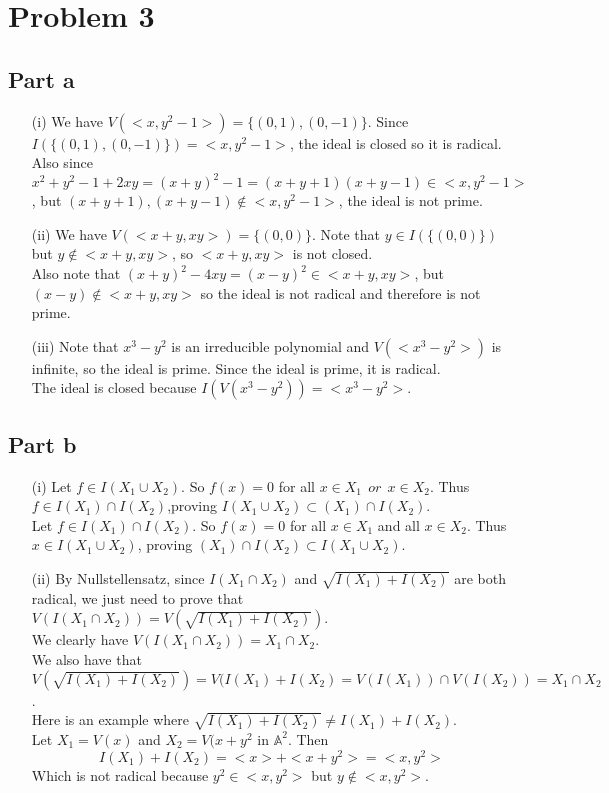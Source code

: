 \documentclass[12pt]{article}
\begin{document}
\clearpage
\section*{Problem 3}
\subsection*{Part a}
\begin{enumerate}
\item[(i)]
We have $V(<x,y^2-1>)=\{(0,1),(0,-1)\}$. Since $I(\{(0,1),(0,-1)\})=<x,y^2-1>$, the ideal is closed so it is radical. \\
Also since $x^2+y^2-1+2xy=(x+y)^2-1=(x+y+1)(x+y-1) \in <x,y^2-1>$, but $(x+y+1),(x+y-1) \not\in <x,y^2-1>$, the ideal is not prime.

\item[(ii)]
We have $V(<x+y,xy>)=\{(0,0)\}$. Note that $y \in I(\{(0,0)\})$ but $y \not\in <x+y,xy>$, so $<x+y,xy>$ is not closed. \\
Also note that $(x+y)^2-4xy=(x-y)^2 \in <x+y,xy>$, but $(x-y) \not\in <x+y,xy>$ so the ideal is not radical and therefore is not prime.
\item[(iii)]
Note that $x^3-y^2$ is an irreducible polynomial and $V(<x^3-y^2>)$ is infinite, so the ideal is prime. Since the ideal is prime, it is radical. \\
The ideal is closed because $I(V(x^3-y^2))=<x^3-y^2>$.

\end{enumerate}
\subsection*{Part b}
\begin{enumerate}
\item[(i)]
Let $f \in I(X_1 \cup X_2)$. So $f(x)=0$ for all $x \in X_1 \ \ or \ \ x \in X_2$. Thus $f \in I(X_1) \cap I(X_2)$,proving $I(X_1 \cup X_2) \subset (X_1) \cap I(X_2)$. \\
Let $f \in I(X_1) \cap I(X_2)$. So $f(x)=0$ for all $x \in X_1$ and all $x \in X_2$. Thus $x \in I(X_1 \cup X_2)$, proving $(X_1) \cap I(X_2) \subset I(X_1 \cup X_2)$. 
\item[(ii)]
By Nullstellensatz, since $I(X_1 \cap X_2)$ and $\sqrt{I(X_1)+I(X_2)}$ are both radical, we just need to prove that
$V(I(X_1 \cap X_2))=V(\sqrt{I(X_1)+I(X_2)})$. \\
We clearly have $V(I(X_1 \cap X_2))=X_1 \cap X_2$. \\
We also have that
$V(\sqrt{I(X_1)+I(X_2)})=V(I(X_1)+I(X_2)=V(I(X_1)) \cap V(I(X_2))=X_1 \cap X_2$. \\
Here is an example where $\sqrt{I(X_1)+I(X_2)} \not= I(X_1)+I(X_2)$. \\
Let $X_1=V(x)$ and $X_2=V(x+y^2$ in $\mathbb{A}^2$. Then
$$I(X_1)+I(X_2)=<x>+<x+y^2>=<x,y^2>$$
Which is not radical because $y^2 \in <x,y^2>$ but $y \not\in <x,y^2>$.


\end{enumerate}
\end{document}
